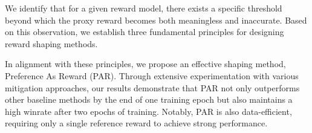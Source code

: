 We identify that for a given reward model, there exists a specific threshold beyond which the proxy reward becomes both meaningless and inaccurate. Based on this observation, we establish three fundamental principles for designing reward shaping methods.

In alignment with these principles, we propose an effective shaping method, Preference As Reward (PAR). Through extensive experimentation with various mitigation approaches, our results demonstrate that PAR not only outperforms other baseline methods by the end of one training epoch but also maintains a high winrate after two epochs of training. Notably, PAR is also data-efficient, requiring only a single reference reward to achieve strong performance.